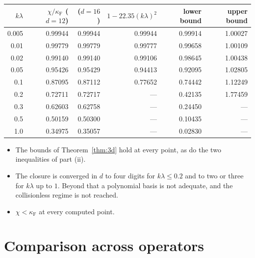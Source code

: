 \documentclass[11pt]{article}
\theoremstyle{remark}
\begin{document}
\begin{center}
\renewcommand{\arraystretch}{1.2}
\begin{tabular}{rrrrrr}
  $k\lambda$ & $\chi/\kappa_{\mathrm F}$ ($d=12$) & ($d=16$)
     & $1-22.35(k\lambda)^2$ & lower bound & upper bound \\ \hline
  0.005 & 0.99944 & 0.99944 & 0.99944 & 0.99914 & 1.00027 \\
  0.01  & 0.99779 & 0.99779 & 0.99777 & 0.99658 & 1.00109 \\
  0.02  & 0.99140 & 0.99140 & 0.99106 & 0.98645 & 1.00438 \\
  0.05  & 0.95426 & 0.95429 & 0.94413 & 0.92095 & 1.02805 \\
  0.1   & 0.87095 & 0.87112 & 0.77652 & 0.74442 & 1.12249 \\
  0.2   & 0.72711 & 0.72717 & ---     & 0.42135 & 1.77459 \\
  0.3   & 0.62603 & 0.62758 & ---     & 0.24450 & --- \\
  0.5   & 0.50159 & 0.50300 & ---     & 0.10435 & --- \\
  1.0   & 0.34975 & 0.35057 & ---     & 0.02830 & --- \\
\end{tabular}
\end{center}
\begin{itemize}
  \item The bounds of Theorem~\ref{thm:3d} hold at every point, as do the
    two inequalities of part (ii).
  \item The closure is converged in $d$ to four digits for
    $k\lambda\le0.2$ and to two or three for $k\lambda$ up to $1$. Beyond
    that a polynomial basis is not adequate, and the collisionless regime is
    not reached.
  \item $\chi<\kappa_{\mathrm F}$ at every computed point.
\end{itemize}

\section{Comparison across operators}
\end{document}
